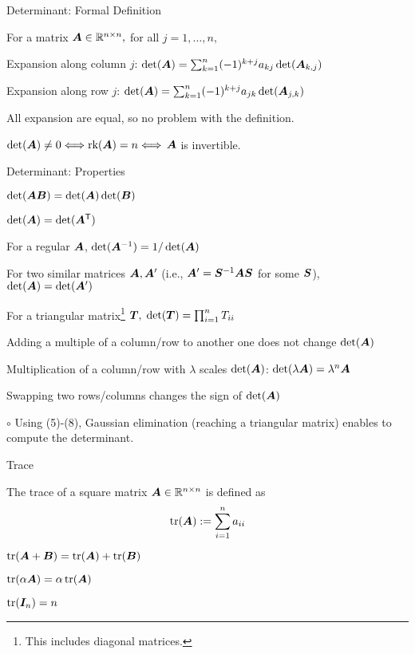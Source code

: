 \documentclass[fleqn,aspectratio=169]{beamer}
\begin{document}
\begin{frame}{Determinant: Formal Definition }

\plitemsep 0.1in

{
For a matrix $\bm{A} \in {\mathbb R}^{n \times n},$ for all $j=1, \ldots, n,$
\bce
\item Expansion along column $j$: 
$
\det(\bm{A}) = \sum_{k=1}^n (-1)^{k+j} a_{kj} \det(\bm{A}_{k,j})
$
\item Expansion along row $j$: 
$
\det(\bm{A})= \sum_{k=1}^n (-1)^{k+j} a_{jk} \det(\bm{A}_{j,k})
$
\ece
}

\bci 
\item All expansion are equal, so no problem with the definition.  
\item \thm $\det(\bm{A}) \neq 0 \Longleftrightarrow \text{rk}(\bm{A}) = n \Longleftrightarrow$ $\bm{A}$ is invertible. 
\eci
\end{frame}

\begin{frame}{Determinant: Properties}

\plitemsep 0.05in

\bce[(1)]
\item $\det(\bm{A}\bm{B}) = \det(\bm{A}) \det(\bm{B})$
\item $\det(\bm{A}) = \det({\bm{A}}^{\mathsf{T}})$
\item For a regular $\bm{A}$, $\det({{\bm{A}}^{-1}}) = 1/\det(\bm{A})$
\item For two similar matrices $\bm{A},\bm{A}'$ (i.e., $\bm{A}' = {{\bm{S}}^{-1}}\bm{A} \bm{S}$ for some $\bm{S}$), $\det(\bm{A}) = \det(\bm{A}')$
\item For a triangular matrix\footnote{This includes diagonal matrices.} $\bm{T},$ $\det(\bm{T}) = \prod_{i=1}^n T_{ii}$
\item Adding a multiple of a column/row to another one does not change $\det(\bm{A})$
\item Multiplication of a column/row with $\lambda$ scales $\det(\bm{A})$: $\det(\lambda \bm{A}) = \lambda^n \bm{A}$
\item Swapping two rows/columns changes the sign of $\det(\bm{A})$
\item[$\circ$] Using (5)-(8), Gaussian elimination (reaching a triangular matrix) enables to compute the determinant. 
\ece
\end{frame}

\begin{frame}{Trace}

\plitemsep 0.1in

\bci
\item {} The trace of a square matrix $\bm{A} \in {\mathbb R}^{n \times n}$ is defined as
$$
\operatorname{tr}(\bm{A}) := \sum_{i=1}^n a_{ii}
$$

\item $\operatorname{tr}(\bm{A} + \bm{B}) = \operatorname{tr}(\bm{A}) + \operatorname{tr}(\bm{B})$
\item $\operatorname{tr}(\alpha \bm{A}) = \alpha \operatorname{tr}(\bm{A})$
\item $\operatorname{tr}(\bm{I}_n) = n$
\eci
\end{frame}
\end{document}
